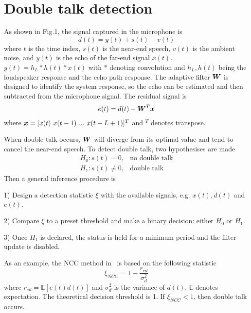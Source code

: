 \documentclass[a4paper]{article}
\begin{document}


\section{Double talk detection}

As shown in Fig.1, the signal captured in the microphone is
\begin{equation}\label{eq:micsig}
  d(t)=y(t)+s(t)+v(t)
\end{equation}
where $t$ is the time index, $s(t)$ is the near-end speech, $v(t)$ is the ambient noise, and $y(t)$ is the echo of the far-end signal $x(t)$. $y(t)=h_L*h(t)*x(t)$ with $*$ denoting convolution and $h_L, h(t)$ being the loudspeaker response and the echo path response. The adaptive filter $\bm{{W}}$ is designed to identify the system response, so the echo can be estimated and then subtracted from the microphone signal. The residual signal is
\begin{equation}\label{eq:err}
  e(t) = d(t) - \bm{{W}}^T\bm{{x}}
\end{equation}
where $\bm{{x}}=[x(t)~x(t-1)~...~x(t-L+1)]^T$ and $^T$ denotes transpose.

When double talk occurs, $\bm{{W}}$ will diverge from its optimal value and tend to cancel the near-end speech. To detect double talk, two hypothesises are made
\begin{eqnarray}
  H_0:  s(t)=0, &\text{no double talk} \\
  H_1:  s(t)\neq 0,& \text{double talk}
\end{eqnarray}
Then a general inference procedure is

1) Design a detection statistic $\xi$ with the available signals, e.g. $x(t),d(t)$ and $e(t)$.

2) Compare $\xi$ to a preset threshold and make a binary decision: either $H_0$ or $H_1$.

3) Once $H_1$ is declared, the status is held for a minimum period and the filter update is disabled.

As an example, the NCC method in~\cite{iqbal2007normalized} is based on the following statistic
\begin{equation}\label{eq:ncc}
  \xi_{NCC}=1-\frac{r_{ed}}{\sigma^2_d}
\end{equation}
where $r_{ed}=\mathbb{E}[e(t)d(t)]$ and $\sigma^2_d$ is the variance of $d(t)$. $\mathbb{E}$ denotes expectation. The theoretical decision threshold is 1. If $\xi_{NCC}<1$, then double talk occurs.
\end{document}

